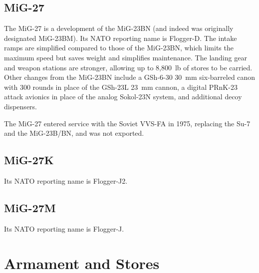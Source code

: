\subsection{MiG-27}

The MiG-27 is a development of the MiG-23BN (and indeed was originally designated MiG-23BM).
Its NATO reporting name is Flogger-D.
The intake ramps are simplified compared to those of the MiG-23BN, which limits the maximum speed but saves weight and simplifies maintenance.
The landing gear and weapon stations are stronger, allowing up to 8,800~lb of stores to be carried.
Other changes from the MiG-23BN include a GSh-6-30 30~mm six-barreled canon with 300 rounds in place of the GSh-23L 23~mm cannon, a digital PRnK-23 attack avionics in place of the analog Sokol-23N system, and additional decoy dispensers.%

The MiG-27 entered service with the Soviet VVS-FA in 1975, replacing the Su-7 and the MiG-23B/BN, and was not exported.%

\subsection{MiG-27K}

Its NATO reporting name is Flogger-J2.

\subsection{MiG-27M}

Its NATO reporting name is Flogger-J.

\section{Armament and Stores}

